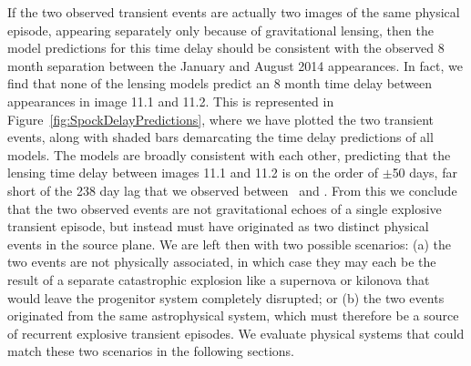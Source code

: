 If the two observed transient events are actually two images of the
same physical episode, appearing separately only because of
gravitational lensing, then the model predictions for this time delay
should be consistent with the observed 8 month separation between the
January and August 2014 appearances.  In fact, we find that none of
the lensing models predict an 8 month time delay between appearances
in image 11.1 and 11.2.  This is represented in
Figure~\ref{fig:SpockDelayPredictions}, where we have plotted the two
transient events, along with shaded bars demarcating the time delay
predictions of all models.  The models are broadly consistent with
each other, predicting that the lensing time delay between images 11.1
and 11.2 is on the order of $\pm$50 days, far short of the 238 day lag
that we observed between \spockone\ and \spocktwo.  From this we
conclude that the two observed events are not gravitational echoes of
a single explosive transient episode, but instead must have originated
as two distinct physical events in the source plane.  We are left then
with two possible scenarios: (a) the two events are not physically
associated, in which case they may each be the result of a separate
catastrophic explosion like a supernova or kilonova that would leave
the progenitor system completely disrupted; or (b) the two events
originated from the same astrophysical system, which must therefore be
a source of recurrent explosive transient episodes.  We evaluate
physical systems that could match these two scenarios in the following
sections.

